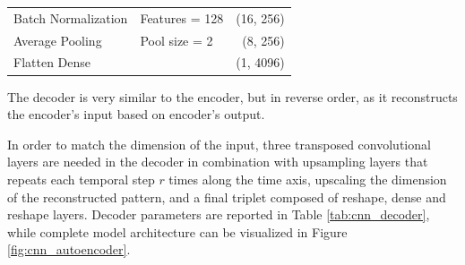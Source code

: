 \begin{footnotesize}
\begin{table}
\begin{tabularx}{0.5\textwidth}{XXr}
			Batch Normalization & Features = 128                                                                        & (16, 256)      \\[0.25cm]
			Average Pooling     & Pool size = 2                                                                         & (8, 256)       \\[0.25cm]
			Flatten Dense       &                                                                                       & (1, 4096)      \\
			\bottomrule
		\end{tabularx}
	\end{table}
\end{footnotesize}

The decoder is very similar to the encoder, but in reverse order, as it reconstructs the encoder’s input based on encoder’s output.

In order to match the dimension of the input, three transposed convolutional layers are needed
in the decoder in combination with upsampling layers that repeats each temporal step $r$ times along the time axis, upscaling the dimension of the reconstructed pattern, and a final triplet composed of reshape, dense and reshape layers. Decoder parameters are reported in Table \vref{tab:cnn_decoder}, while complete model architecture can be visualized in Figure \vref{fig:cnn_autoencoder}.

